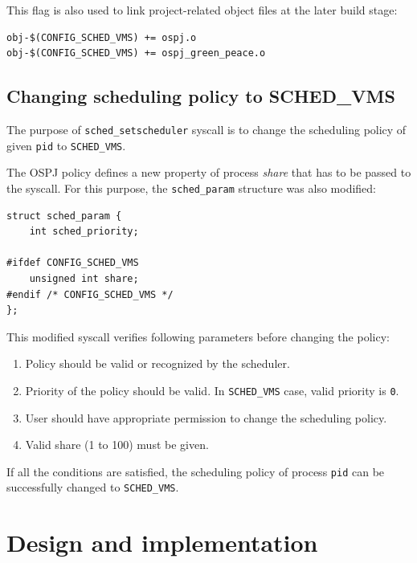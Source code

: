 \documentclass[]{report}
\begin{document}
This flag is also used to link project-related object files at the later
build stage:

\begin{lstlisting}[style=c, caption=/Kernel/kernel/sched/Makefile, firstnumber=20]
obj-$(CONFIG_SCHED_VMS) += ospj.o
obj-$(CONFIG_SCHED_VMS) += ospj_green_peace.o
\end{lstlisting}

\subsection{Changing scheduling policy to
SCHED\_VMS}\label{changing-scheduling-policy-to-schedux5fvms}

The purpose of \lstinline!sched_setscheduler! syscall is to change the
scheduling policy of given \lstinline!pid! to \lstinline!SCHED_VMS!.

The OSPJ policy defines a new property of process \emph{share} that has
to be passed to the syscall. For this purpose, the
\lstinline!sched_param! structure was also modified:

\begin{lstlisting}[style=c, caption=include/linux/sched.h, firstnumber=7]
struct sched_param {
    int sched_priority;

#ifdef CONFIG_SCHED_VMS
    unsigned int share;
#endif /* CONFIG_SCHED_VMS */
};
\end{lstlisting}

This modified syscall verifies following parameters before changing the
policy:

\begin{enumerate}
\def\labelenumi{\arabic{enumi}.}
\itemsep1pt\parskip0pt
\item
  Policy should be valid or recognized by the scheduler.
\item
  Priority of the policy should be valid. In \lstinline!SCHED_VMS! case,
  valid priority is \lstinline!0!.
\item
  User should have appropriate permission to change the scheduling
  policy.
\item
  Valid share (1 to 100) must be given.
\end{enumerate}

If all the conditions are satisfied, the scheduling policy of process
\lstinline!pid! can be successfully changed to \lstinline!SCHED_VMS!.

\section{Design and implementation}\label{design-and-implementation}
\end{document}
